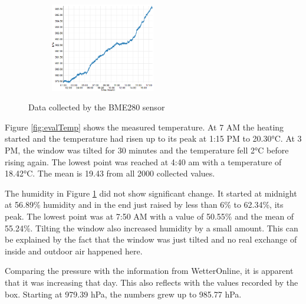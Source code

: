 \documentclass{article}      %
\begin{document}
\begin{figure}[ht]
\begin{subfigure}[c]{0.5\textwidth}
    \label{fig:evalHum}
  \end{subfigure}
  \par\medskip
  \begin{subfigure}[c]{\textwidth}
    \centering
    \includegraphics[width=0.5\textwidth]{expEval/Pres_09-02-2018.PNG}
    \label{fig:evalPres}
  \end{subfigure}
  \caption{Data collected by the BME280 sensor}
\end{figure}

Figure \ref{fig:evalTemp} shows the measured temperature. At 7 AM the heating started and the temperature had risen up to its peak at 1:15 PM to 20.30°\gls{C}. At 3 PM, the window was tilted for 30 minutes and the temperature fell 2°\gls{C} before rising again. The lowest point was reached at 4:40 am with a temperature of 18.42°\gls{C}. The mean is 19.43 from all 2000 collected values.

The humidity in Figure \ref{fig:evalHum} did not show significant change. It started at midnight at 56.89\% humidity and in the end just raised by less than 6\% to 62.34\%, its peak. The lowest point was at 7:50 AM with a value of 50.55\% and the mean of 55.24\%. Tilting the window also increased humidity by a small amount. This can be explained by the fact that the window was just tilted and no real exchange of inside and outdoor air happened here.

Comparing the pressure with the information from WetterOnline, it is apparent that it was increasing that day. This also reflects with the values recorded by the box. Starting at 979.39 \gls{hPa}, the numbers grew up to 985.77 \gls{hPa}.

\newpage
\end{document}
